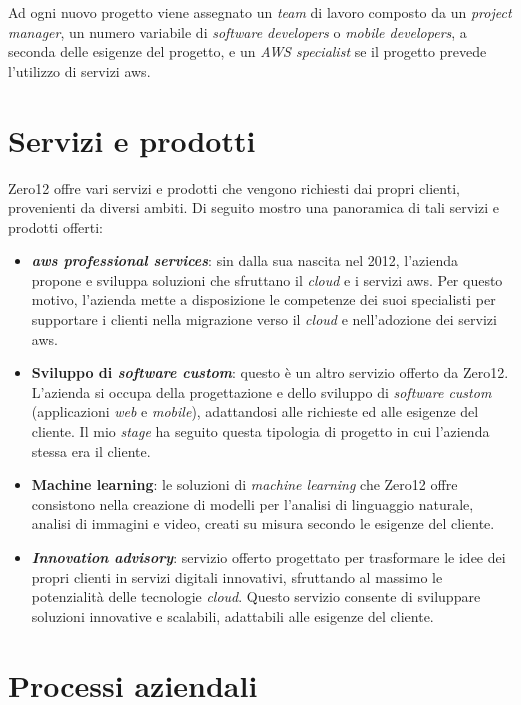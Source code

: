 \noindent
Ad ogni nuovo progetto viene assegnato un \textit{team} di lavoro composto da un \textit{project manager}, un numero variabile di \textit{software developers} o \textit{mobile developers}, a seconda delle esigenze del progetto, e un \textit{AWS specialist} se il progetto prevede l'utilizzo di servizi \gls{aws}. 

\section{Servizi e prodotti}
Zero12 offre vari servizi e prodotti che vengono richiesti dai propri clienti, provenienti da diversi ambiti.
Di seguito mostro una panoramica di tali servizi e prodotti offerti:
\begin{itemize}
    \item \textbf{\textit{\gls{aws} professional services}}: sin dalla sua nascita nel 2012, l'azienda propone e sviluppa soluzioni che sfruttano il \textit{cloud} e i servizi \gls{aws}. Per questo motivo, l'azienda mette a disposizione le competenze dei suoi specialisti
    per supportare i clienti nella migrazione verso il \textit{cloud} e nell'adozione dei servizi \gls{aws}.
    \item \textbf{Sviluppo di \textit{software custom}}: questo è un altro servizio offerto da Zero12. L'azienda si occupa della progettazione e dello sviluppo di \textit{software custom} (applicazioni \textit{web} e \textit{mobile}), adattandosi alle richieste ed alle esigenze del cliente. Il mio \textit{stage} ha seguito questa tipologia di progetto in cui l'azienda stessa era il cliente.
    \item \textbf{Machine learning}: le soluzioni di \textit{machine learning} che Zero12 offre consistono nella creazione di modelli per l'analisi di linguaggio naturale, analisi di immagini e video, creati su misura secondo le esigenze del cliente.
    \item \textbf{\textit{Innovation advisory}}: servizio offerto progettato per trasformare le idee dei propri clienti in servizi digitali innovativi, sfruttando al massimo le potenzialità delle tecnologie \textit{cloud}. Questo servizio consente di sviluppare 
    soluzioni innovative e scalabili, adattabili alle esigenze del cliente.
\end{itemize}
\section{Processi aziendali}
